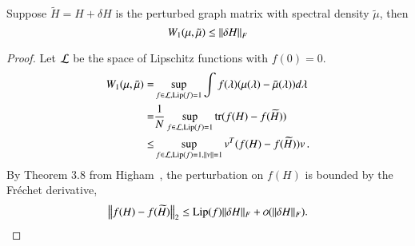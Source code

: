 \begin{theorem}
	Suppose $\widetilde{H} = H + \delta H$ is the perturbed graph matrix with
	spectral density $\tilde{\mu}$, then
	\begin{equation*}
		W_1(\mu, \tilde{\mu}) \leq \left\lVert\delta H\right\rVert_F
	\end{equation*}
\end{theorem}
\begin{proof}
	Let $\mathcal{L}$ be the space of Lipschitz functions with $f(0)=0$.
	\begin{align*}\label{eqn:proof1}
		W_1(\mu, \tilde{\mu})=& \sup_{f\in\mathcal{L}, \operatorname{Lip}(f)=1} \int f(\lambda) (\mu
		(\lambda)-\tilde{\mu}(\lambda))d\lambda \\
		=&\frac{1}{N}\sup_{f\in\mathcal{L}, \operatorname{Lip}(f)=1}\operatorname{tr}(f(H)-f(\widetilde{H}))\\
		\leq& \sup_{f\in\mathcal{L}, \operatorname{Lip}(f)=1, \|v\|=1} v^T(f(H)-f(\widetilde{H}))v\,.
	\end{align*}
	By Theorem 3.8 from Higham~\cite{higham2008functions}, the perturbation on
	$f(H)$ is bounded by the Fr\'{e}chet derivative,
	\begin{equation}
		\norm{f(H) - f(\widetilde{H})}_2\leq \Lip(f)\|\delta H\|_F + \calo(\|\delta
		H\|_F).
	\end{equation}
\end{proof}